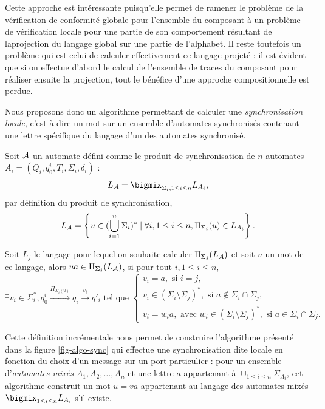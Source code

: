 Cette approche est int\'eressante puisqu'elle permet de ramener le
probl\`eme de la v\'erification de conformit\'e globale pour
l'ensemble du composant \`a un probl\`eme de v\'erification locale
pour une partie de son comportement r\'esultant de laprojection du
langage global sur une partie de l'alphabet. Il reste toutefois un
probl\`eme qui est celui de calculer effectivement ce langage
projet\'e : il est \'evident que si on effectue d'abord le calcul
de l'ensemble de traces du composant pour r\'ealiser ensuite la
projection, tout le b\'en\'efice d'une approche compositionnelle est
perdue.

Nous proposons donc un algorithme permettant de calculer une
\emph{synchronisation locale}, c'est \`a dire un mot sur un ensemble
d'automates synchronis\'es contenant une lettre sp\'ecifique du
langage d'un des automates synchronis\'e. 

Soit ${\cal A}$ un automate d\'efini comme le
produit de synchronisation de $n$ automates
$A_i=(Q_i,q_0^i,T_i,\Sigma_i,\delta_i)$ :
$$
L_{\cal A} = \bigmix_{\Sigma_i,1\leq i\leq n} L_{A_i},
$$
par d\'efinition du produit de synchronisation, 
$$
L_{\cal A} = \left\{u\in (\bigcup_{i=1}^n \Sigma_i)^* \mid \forall i, 1\leq
i\leq n, \Pi_{\Sigma_i}(u) \in L_{A_i}\right\}.
$$

Soit $L_j$ le langage pour lequel on souhaite calculer
$\Pi_{\Sigma_j}(L_{\cal A})$ et soit $u$ un mot de ce langage, alors
$ua \in \Pi_{\Sigma_j}(L_{\cal A})$,
si pour tout $i,1\leq i\leq n$, 
$$
\exists v_i\in \Sigma_i^*, q_0^i \xrightarrow{\Pi_{\Sigma_i(u)}} q_i\xrightarrow{v_i} q'_i \mbox{~tel que~} \left\{
    \begin{array}{l}
v_i = a, \mbox{~si~} i=j,\\
v_i \in (\Sigma_i\setminus \Sigma_j)^*, \mbox{~si~} a\not\in \Sigma_i\cap \Sigma_j,\\
v_i = w_ia, \mbox{~avec~} w_i\in (\Sigma_i\setminus \Sigma_j)^*,
\mbox{~si~} a\in \Sigma_i\cap \Sigma_j.
    \end{array}\right.
$$

Cette d\'efinition incr\'ementale nous permet de construire
l'algorithme pr\'esent\'e dans la figure \ref{fig-algo-sync} qui effectue une synchronisation dite locale en fonction
du choix d'un message sur un port particulier :  pour un
ensemble d'\emph{automates mix\'es} $A_1,A_2,\dots,A_n$ et une lettre
$a$ appartenant \`a $\cup_{1\leq i\leq n}\Sigma_{A_i}$, cet
algorithme construit un mot $u=va$
appartenant au langage des automates mix\'es $\bigmix_{1\leq i\leq n}
L_{A_i}$ s'il existe.

